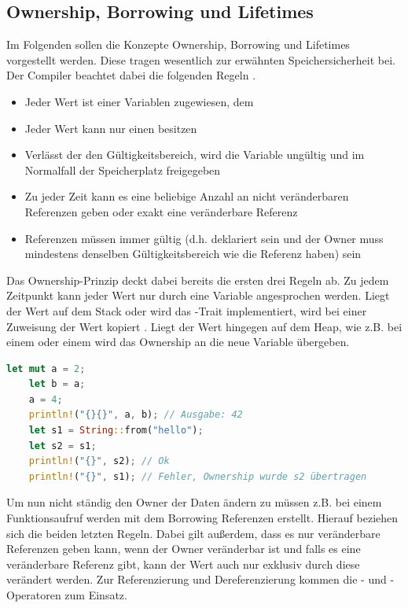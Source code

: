 \documentclass[11pt,a4paper, ngerman]{article}
\begin{document}
\subsection{Ownership, Borrowing und Lifetimes}
Im Folgenden sollen die Konzepte Ownership, Borrowing und Lifetimes vorgestellt werden. Diese tragen wesentlich zur erwähnten Speichersicherheit bei. Der Compiler beachtet dabei die folgenden Regeln \cite{Rules1} \cite{Rules2}.

\begin{itemize}
    \item Jeder Wert ist einer Variablen zugewiesen, dem 
    \item Jeder Wert kann nur einen  besitzen
    \item Verlässt der  den Gültigkeitsbereich, wird die Variable ungültig und im Normalfall der Speicherplatz freigegeben
    \item Zu jeder Zeit kann es eine beliebige Anzahl an nicht veränderbaren Referenzen geben oder exakt eine veränderbare Referenz
    \item Referenzen müssen immer gültig (d.h. deklariert sein und der Owner muss mindestens denselben Gültigkeitsbereich wie die Referenz haben) sein
\end{itemize}

\label{sec:Ownership}
Das Ownership-Prinzip deckt dabei bereits die ersten drei Regeln ab. Zu jedem Zeitpunkt kann jeder Wert nur durch eine Variable angesprochen werden. Liegt der Wert auf dem Stack oder wird das -Trait implementiert, wird bei einer Zuweisung der Wert kopiert \cite{CopyTraitOwner}. Liegt der Wert hingegen auf dem Heap, wie z.B. bei einem  oder einem  wird das Ownership an die neue Variable übergeben.

\begin{lstlisting}[language=rust, caption={ownership}]
    let mut a = 2;
    let b = a;
    a = 4;
    println!("{}{}", a, b); // Ausgabe: 42
    let s1 = String::from("hello");
    let s2 = s1;
    println!("{}", s2); // Ok
    println!("{}", s1); // Fehler, Ownership wurde s2 übertragen
\end{lstlisting}

Um nun nicht ständig den Owner der Daten ändern zu müssen z.B. bei einem Funktionsaufruf werden mit dem Borrowing Referenzen erstellt. Hierauf beziehen sich die beiden letzten Regeln. Dabei gilt außerdem, dass es nur veränderbare Referenzen geben kann, wenn der Owner veränderbar ist und falls es eine veränderbare Referenz gibt, kann der Wert auch nur exklusiv durch diese verändert werden. Zur Referenzierung und Dereferenzierung kommen die \codeword{&}- und \codeword{*}-Operatoren zum Einsatz.
\end{document}
